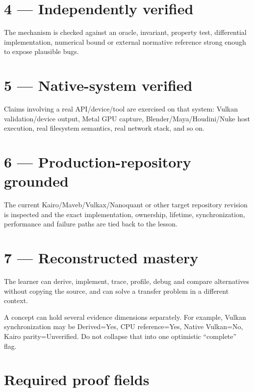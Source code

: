 \section{4 --- Independently verified}\label{appendix-2a2e5bd7143a-independently-verified}

The mechanism is checked against an oracle, invariant, property test, differential implementation, numerical bound or external normative reference strong enough to expose plausible bugs.

\section{5 --- Native-system verified}\label{appendix-2a2e5bd7143a-native-system-verified}

Claims involving a real API/device/tool are exercised on that system: Vulkan validation/device output, Metal GPU capture, Blender/Maya/Houdini/Nuke host execution, real filesystem semantics, real network stack, and so on.

\section{6 --- Production-repository grounded}\label{appendix-2a2e5bd7143a-production-repository-grounded}

The current Kairo/Maveb/Vulkax/Nanoquant or other target repository revision is inspected and the exact implementation, ownership, lifetime, synchronization, performance and failure paths are tied back to the lesson.

\section{7 --- Reconstructed mastery}\label{appendix-2a2e5bd7143a-reconstructed-mastery}

The learner can derive, implement, trace, profile, debug and compare alternatives without copying the source, and can solve a transfer problem in a different context.

A concept can hold several evidence dimensions separately. For example, Vulkan synchronization may be Derived=Yes, CPU reference=Yes, Native Vulkan=No, Kairo parity=Unverified. Do not collapse that into one optimistic ``complete'' flag.

\section{Required proof fields}\label{appendix-2a2e5bd7143a-required-proof-fields}

